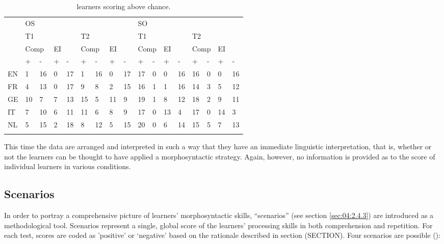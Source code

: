 \begin{table}
    \begin{tabularx}{\textwidth}{XXXXXXXXXXXXXXXXX}
         & \multicolumn{8}{X}{ OS} & \multicolumn{8}{X}{ SO}\\
        \lsptoprule
        & \multicolumn{4}{X}{ T1} & \multicolumn{4}{X}{ T2} & \multicolumn{4}{X}{ T1} & \multicolumn{4}{X}{ T2}\\
        & \multicolumn{2}{X}{ Comp} & \multicolumn{2}{X}{ EI} & \multicolumn{2}{X}{ Comp} & \multicolumn{2}{X}{ EI} & \multicolumn{2}{X}{ Comp} & \multicolumn{2}{X}{ EI} & \multicolumn{2}{X}{ Comp} & \multicolumn{2}{X}{ EI}\\
        & + & {}- & + & {}- & + & {}- & + & {}- & + & {}- & + & {}- & + & {}- & + & {}-\\
        EN & 1 & 16 & 0 & 17 & 1 & 16 & 0 & 17 & 17 & 0 & 0 & 16 & 16 & 0 & 0 & 16\\
        FR & 4 & 13 & 0 & 17 & 9 & 8 & 2 & 15 & 16 & 1 & 1 & 16 & 14 & 3 & 5 & 12\\
        GE & 10 & 7 & 7 & 13 & 15 & 5 & 11 & 9 & 19 & 1 & 8 & 12 & 18 & 2 & 9 & 11\\
        IT & 7 & 10 & 6 & 11 & 11 & 6 & 8 & 9 & 17 & 0 & 13 & 4 & 17 & 0 & 14 & 3\\
        NL & 5 & 15 & 2 & 18 & 8 & 12 & 5 & 15 & 20 & 0 & 6 & 14 & 15 & 5 & 7 & 13\\
        \lspbottomrule
    \end{tabularx}
    \caption{learners scoring above chance.}
    \label{tab:06:1}
\end{table}

This time the data are arranged and interpreted in such a way that they have an immediate linguistic interpretation, that is, whether or not the learners can be thought to have applied a morphosyntactic strategy. Again, however, no information is provided as to the score of individual learners in various conditions.

\subsection{Scenarios}\label{sec:06:2.2}

In order to portray a comprehensive picture of learners’ morphosyntactic skills, “scenarios” (see section \ref{sec:04:2.4.3}) are introduced as a methodological tool. Scenarios represent a single, global score of the learners' processing skills in both comprehension and repetition. For each test, scores are coded as 'positive' or ‘negative’ based on the rationale described in section (SECTION). Four scenarios are possible ():

